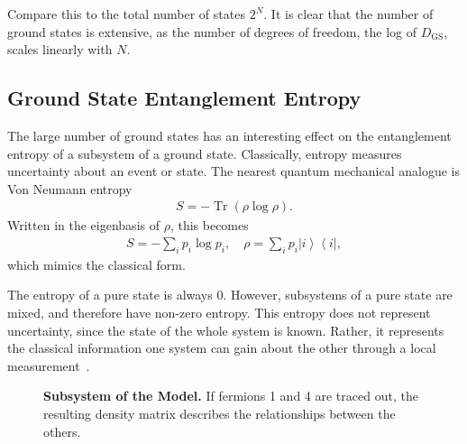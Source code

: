 \documentclass[12pt]{article} %
\newcommand{\ket}[1]{\left|#1\right\rangle}
\newcommand{\bra}[1]{\left\langle#1\right|}
\DeclareMathOperator{\Tr}{Tr}
\begin{document}
Compare this to the total number of states $2^N$. It is clear that the number of ground states is extensive, as the number of degrees of freedom, the log of $D_\text{GS}$, scales linearly with $N$.

\subsection{Ground State Entanglement Entropy} \emph{} \label{sub:entangle}

The large number of ground states has an interesting effect on the entanglement entropy of a subsystem of a ground state. Classically, entropy measures uncertainty about an event or state. The nearest quantum mechanical analogue is Von Neumann entropy
\begin{align}
S = -\Tr(\rho\log\rho).\label{eqn:vnent}
\end{align}
Written in the eigenbasis of $\rho$, this becomes 
\begin{align}
S = -\sum_ip_i\log p_i,\quad \rho = \sum_i p_i\ket{i}\bra{i},
\end{align}
which mimics the classical form.

The entropy of a pure state is always 0. However, subsystems of a pure state are mixed, and therefore have non-zero entropy. This entropy does not represent uncertainty, since the state of the whole system is known. Rather, it represents the classical information one system can gain about the other through a local measurement~\cite{janzing09}.

\begin{figure}
	\centering
	\caption{\textbf{Subsystem of the Model.} If fermions 1 and 4 are traced out, the resulting density matrix describes the relationships between the others.}
	\label{fig:subsys}
\end{figure}
\end{document}
